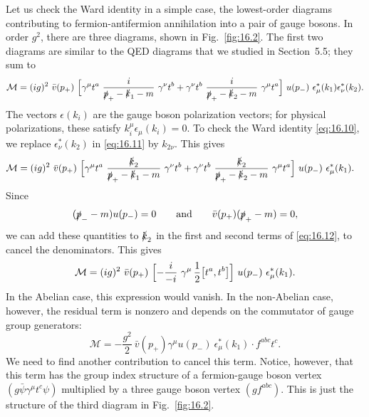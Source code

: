Let us check the Ward identity in a simple case, the lowest-order diagrams
contributing to fermion-antifermion annihilation into a pair of gauge bosons.
In order $g^2$, there are three diagrams, shown in Fig.~\ref{fig:16.2}.  The
first two diagrams are similar to the QED diagrams that we studied in
Section~5.5; they sum to
\begin{equation}
  \mathcal{M} = (ig)^2\ \bar{v}(p_+)\ \Bigl[ \gamma^\mu t^a\ \frac{i}{
    \slashed{p}_+ - \slashed{k}_1 - m}\ \gamma^\nu t^b
    + \gamma^\nu t^b\ \frac{i}{\slashed{p}_+ - \slashed{k}_2 - m}\
      \gamma^\mu t^a \Bigr]\ u(p_-)\ \epsilon^{*}_\mu(k_1)
        \epsilon^{*}_\nu(k_2) .
  \label{eq:16.11}
\end{equation}
The vectors $\epsilon(k_i)$ are the gauge boson polarization vectors; for
physical polarizations, these satisfy $k^\mu_i\epsilon_\mu(k_i) = 0$.  To check
the Ward identity \eqref{eq:16.10}, we replace $\epsilon^{*}_\nu(k_2)$ in
\eqref{eq:16.11} by $k_{2\nu}$.  This gives
\begin{equation}
  \begin{aligned}
    \mathcal{M} &= (ig)^2\ \bar{v}(p_+)\ \Bigl[ \gamma^\mu t^a\ \frac{\slashed{k}_2}
      {\slashed{p}_+ - \slashed{k}_1 - m}\ \gamma^\nu t^b
      + \gamma^\nu t^b\ \frac{\slashed{k}_2}{\slashed{p}_+ - \slashed{k}_2 - m}\
        \gamma^\mu t^a \Bigr]\ u(p_-)\ \epsilon^{*}_\mu(k_1) .
  \end{aligned}
  \label{eq:16.12}
\end{equation}
Since
\begin{equation}
  (\slashed{p}_- - m)u(p_-) = 0
  \qquad\text{and}\qquad
  \bar{v}(p_+)(\slashed{p}_+ - m) = 0 ,
  \label{eq:16.13}
\end{equation}
we can add these quantities to $\slashed{k}_2$ in the first and second terms
of \eqref{eq:16.12}, to cancel the denominators.  This gives
\begin{equation}
  \mathcal{M} = (ig)^2\ \bar{v}(p_+)\ \Bigl[ -\frac{i}{-i}\ \gamma^\mu\,
    \frac{1}{2}\bigl[ t^a, t^b \bigr] \Bigr]\ u(p_-)\ \epsilon^{*}_\mu(k_1) .
  \label{eq:16.14}
\end{equation}
In the Abelian case, this expression would vanish.  In the non-Abelian case,
however, the residual term is nonzero and depends on the commutator of gauge
group generators:
\begin{equation}
  \mathcal{M} = -\frac{g^2}{2}\ \bar{v}(p_+)\gamma^\mu u(p_-)\ \epsilon^{*}_\mu(k_1)
    \cdot f^{abc}t^c .
  \label{eq:16.15}
\end{equation}
We need to find another contribution to cancel this term.  Notice, however,
that this term has the group index structure of a fermion-gauge boson vertex
$(g\bar{\psi}\gamma^\mu t^c\psi)$ multiplied by a three gauge boson vertex
$(gf^{abc})$.  This is just the structure of the third diagram in
Fig.~\ref{fig:16.2}.

